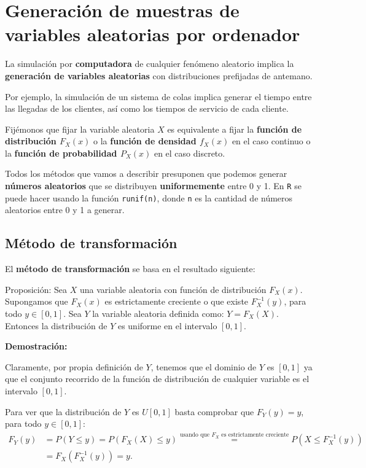 \documentclass[]{book}
\begin{document}
\hypertarget{generaciuxf3n-de-muestras-de-variables-aleatorias-por-ordenador}{%
\section{Generación de muestras de variables aleatorias por ordenador}\label{generaciuxf3n-de-muestras-de-variables-aleatorias-por-ordenador}}

La simulación por \textbf{computadora} de cualquier fenómeno aleatorio implica la \textbf{generación de variables aleatorias} con distribuciones prefijadas de antemano.

Por ejemplo, la simulación de un sistema de colas implica generar el tiempo entre las llegadas de los clientes, así como los tiempos de servicio de cada cliente.

Fijémonos que fijar la variable aleatoria \(X\) es equivalente a fijar la \textbf{función de distribución \(F_X(x)\)} o la \textbf{función de densidad \(f_X(x)\)} en el caso continuo o la \textbf{función de probabilidad \(P_X(x)\)} en el caso discreto.

Todos los métodos que vamos a describir presuponen que podemos generar \textbf{números aleatorios} que se distribuyen \textbf{uniformemente} entre 0 y 1. En \texttt{R} se puede hacer usando la función \texttt{runif(n)}, donde \texttt{n} es la cantidad de números aleatorios entre 0 y 1 a generar.

\hypertarget{muxe9todo-de-transformaciuxf3n}{%
\subsection{Método de transformación}\label{muxe9todo-de-transformaciuxf3n}}

El \textbf{método de transformación} se basa en el resultado siguiente:

Proposición:
Sea \(X\) una variable aleatoria con función de distribución \(F_X(x)\). Supongamos que \(F_X(x)\) es estrictamente creciente o que existe \(F_X^{-1}(y)\), para todo \(y\in [0,1]\). Sea \(Y\) la variable aleatoria definida como: \(Y=F_X(X)\). Entonces la distribución de \(Y\) es uniforme en el intervalo \([0,1]\).

\textbf{Demostración:}

Claramente, por propia definición de \(Y\), tenemos que el dominio de \(Y\) es \([0,1]\) ya que el conjunto recorrido de la función de distribución de cualquier variable es el intervalo \([0,1]\).

Para ver que la distribución de \(Y\) es \(U[0,1]\) basta comprobar que \(F_Y(y)=y\), para todo \(y\in [0,1]\):
\[
\begin{array}{rl}
F_Y(y) & =P(Y\leq y)=P(F_X(X)\leq y)\stackrel{\mbox{usando que $F_X$ es estrictamente creciente}}{=} P(X\leq F_X^{-1}(y)) \\ & =F_X(F_X^{-1}(y))=y.
\end{array}
\]
\end{document}
